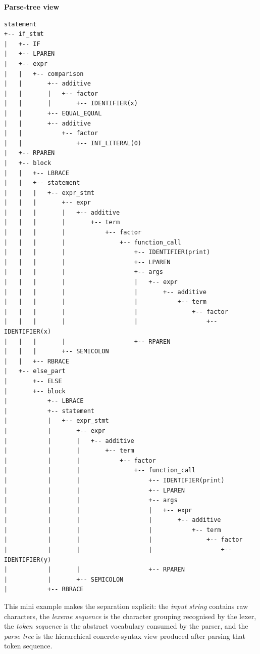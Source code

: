 \documentclass[11pt,a4paper]{article}
\begin{document}
\noindent\textbf{Parse-tree view}
\begin{lstlisting}[language={},numbers=none,frame=single,backgroundcolor=\color{codebg}]
statement
+-- if_stmt
|   +-- IF
|   +-- LPAREN
|   +-- expr
|   |   +-- comparison
|   |       +-- additive
|   |       |   +-- factor
|   |       |       +-- IDENTIFIER(x)
|   |       +-- EQUAL_EQUAL
|   |       +-- additive
|   |           +-- factor
|   |               +-- INT_LITERAL(0)
|   +-- RPAREN
|   +-- block
|   |   +-- LBRACE
|   |   +-- statement
|   |   |   +-- expr_stmt
|   |   |       +-- expr
|   |   |       |   +-- additive
|   |   |       |       +-- term
|   |   |       |           +-- factor
|   |   |       |               +-- function_call
|   |   |       |                   +-- IDENTIFIER(print)
|   |   |       |                   +-- LPAREN
|   |   |       |                   +-- args
|   |   |       |                   |   +-- expr
|   |   |       |                   |       +-- additive
|   |   |       |                   |           +-- term
|   |   |       |                   |               +-- factor
|   |   |       |                   |                   +-- IDENTIFIER(x)
|   |   |       |                   +-- RPAREN
|   |   |       +-- SEMICOLON
|   |   +-- RBRACE
|   +-- else_part
|       +-- ELSE
|       +-- block
|           +-- LBRACE
|           +-- statement
|           |   +-- expr_stmt
|           |       +-- expr
|           |       |   +-- additive
|           |       |       +-- term
|           |       |           +-- factor
|           |       |               +-- function_call
|           |       |                   +-- IDENTIFIER(print)
|           |       |                   +-- LPAREN
|           |       |                   +-- args
|           |       |                   |   +-- expr
|           |       |                   |       +-- additive
|           |       |                   |           +-- term
|           |       |                   |               +-- factor
|           |       |                   |                   +-- IDENTIFIER(y)
|           |       |                   +-- RPAREN
|           |       +-- SEMICOLON
|           +-- RBRACE
\end{lstlisting}

\noindent This mini example makes the separation explicit:
the \emph{input string} contains raw characters,
the \emph{lexeme sequence} is the character grouping recognised by the lexer,
the \emph{token sequence} is the abstract vocabulary consumed by the parser,
and the \emph{parse tree} is the hierarchical concrete-syntax view produced
after parsing that token sequence.
\end{document}
